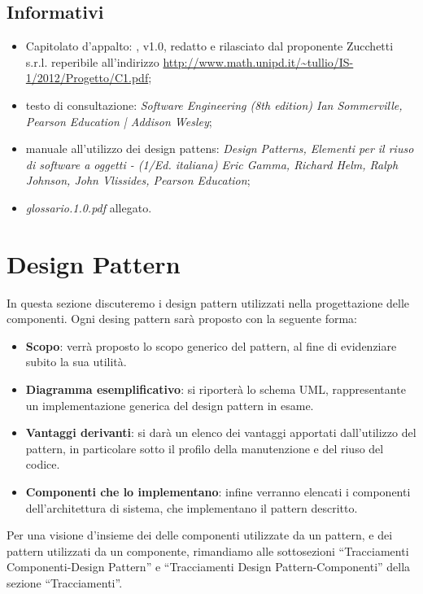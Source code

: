 \subsection{Informativi}
\begin{itemize}
\item[] Capitolato d'appalto: \caName{}, v1.0, redatto e rilasciato dal proponente Zucchetti s.r.l. reperibile all'indirizzo \url{http://www.math.unipd.it/~tullio/IS-1/2012/Progetto/C1.pdf};
\item[] testo di consultazione: \textit{Software Engineering (8th edition) Ian Sommerville, Pearson Education | Addison Wesley};
\item[] manuale all'utilizzo dei design pattens: \textit{Design Patterns, Elementi per il riuso di software a oggetti - (1/Ed. italiana) Eric Gamma, Richard Helm, Ralph Johnson, John Vlissides, Pearson Education};
\item[] \textit{glossario.1.0.pdf} allegato.
\end{itemize}

\clearpage
\section{Design Pattern}
In questa sezione discuteremo i design pattern utilizzati nella progettazione delle componenti. Ogni desing pattern sarà proposto con la seguente forma:

\begin{itemize}
	\item \textbf{Scopo}: verrà proposto lo scopo generico del pattern, al fine di evidenziare subito la sua utilità.
	\item \textbf{Diagramma esemplificativo}: si riporterà lo schema UML, rappresentante un implementazione generica del design pattern in esame.
	\item \textbf{Vantaggi derivanti}: si darà un elenco dei vantaggi apportati dall'utilizzo del pattern, in particolare sotto il profilo della manutenzione e del riuso del codice.
	\item \textbf{Componenti che lo implementano}: infine verranno elencati i componenti dell'architettura di sistema, che implementano il pattern descritto.
\end{itemize}

Per una visione d'insieme dei delle componenti utilizzate da un pattern, e dei pattern utilizzati da un componente, rimandiamo alle sottosezioni ``Tracciamenti Componenti-Design Pattern'' e ``Tracciamenti Design Pattern-Componenti'' della sezione ``Tracciamenti''.

